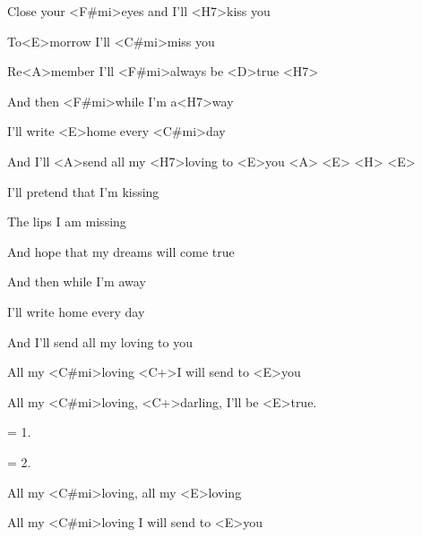 

\zs
Close your <F#mi>eyes and I'll <H7>kiss you

To<E>morrow I'll <C#mi>miss you

Re<A>member I'll <F#mi>always be <D>true <H7>

And then <F#mi>while I'm a<H7>way

I'll write <E>home every <C#mi>day

And I'll <A>send all my <H7>loving to <E>you <A> <E> <H> <E>
\ks

\zs
I'll pretend that I'm kissing

The lips I am missing

And hope that my dreams will come true

And then while I'm away

I'll write home every day

And I'll send all my loving to you
\ks

\zr
All my <C#mi>loving <C+>I will send to <E>you

All my <C#mi>loving, <C+>darling, I'll be <E>true.
\kr

\zs
= 1.
\ks

\zs
= 2.
\ks

\zr
All my <C#mi>loving, all my <E>loving

All my <C#mi>loving I will send to <E>you
\kr

\kp

